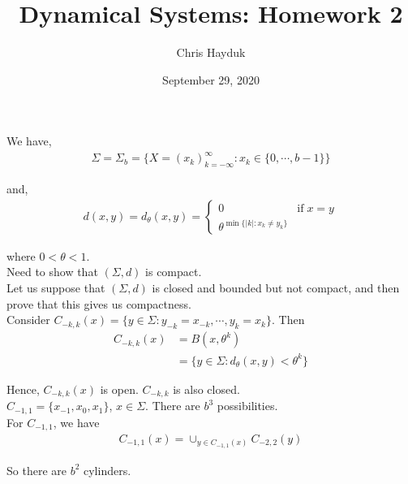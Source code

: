 \documentclass[12pt]{article}
\newenvironment{problem}[2][Problem]{\begin{trivlist}
\item[\hskip \labelsep {\bfseries #1}\hskip \labelsep {\bfseries #2.}]}{\end{trivlist}}
\begin{document}
\title{Dynamical Systems: Homework 2}

\author{Chris Hayduk}
\date{September 29, 2020}

\maketitle

\begin{problem}{1}
\end{problem}

We have,
\begin{align*}
\Sigma = \Sigma_b = \{X = (x_k)_{k = -\infty}^{\infty}: x_k \in \{0, \cdots, b - 1\}\}
\end{align*}

and,
\begin{align*}
d(x,y) = d_{\theta}(x,y) = \begin{cases*}
      0 & \text{if} \; x = y \\
      \theta^{\min\{|k|: x_k \neq y_k\}} &
    \end{cases*}
\end{align*}

where $0 < \theta < 1$.\\

Need to show that $(\Sigma, d)$ is compact.\\

Let us suppose that $(\Sigma, d)$ is closed and bounded but not compact, and then prove that this gives us compactness.\\

Consider $C_{-k, k}(x) = \{y \in \Sigma: y_{-k} = x_{-k}, \cdots, y_k = x_k\}$. Then
\begin{align*}
C_{-k, k}(x) &= B(x, \theta^k)\\
&= \{y \in \Sigma: d_{\theta}(x,y) < \theta^k\}
\end{align*}

Hence, $C_{-k, k}(x)$ is open. $C_{-k, k}$ is also closed.\\

$C_{-1, 1} = \{x_{-1}, x_0, x_1\}$, $x \in \Sigma$. There are $b^3$ possibilities.\\

For $C_{-1, 1}$, we have
\begin{align*}
C_{-1, 1}(x) = \cup_{y \in C_{-1, 1}(x)} C_{-2, 2}(y) 
\end{align*}

So there are $b^2$ cylinders.\\
\end{document}

